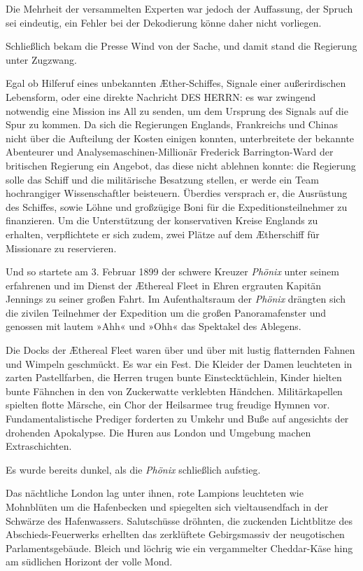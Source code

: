 Die Mehrheit der versammelten Experten war jedoch der Auffassung,
der Spruch sei eindeutig, ein Fehler bei der Dekodierung könne
daher nicht vorliegen.

Schließlich bekam die Presse Wind von der Sache, und damit stand
die Regierung unter Zugzwang.

\bigpar

Egal ob Hilferuf eines unbekannten Æther-Schiffes, Signale einer
außerirdischen Lebensform, oder eine direkte Nachricht DES HERRN:
es war zwingend notwendig eine Mission ins All zu senden, um dem
Ursprung des Signals auf die Spur zu kommen. Da sich die
Regierungen Englands, Frankreichs und Chinas nicht über die
Aufteilung der Kosten einigen konnten, unterbreitete der bekannte
Abenteurer und Analysemaschinen-Millionär Frederick Barrington-Ward
der britischen Regierung ein Angebot, das diese nicht ablehnen
konnte: die Regierung solle das Schiff und die militärische
Besatzung stellen, er werde ein Team hochrangiger Wissenschaftler
beisteuern. Überdies versprach er, die Ausrüstung des Schiffes,
sowie Löhne und großzügige Boni für die Expeditionsteilnehmer zu
finanzieren. Um die Unterstützung der konservativen Kreise Englands
zu erhalten, verpflichtete er sich zudem, zwei Plätze auf dem
Ætherschiff für Missionare zu reservieren.

\bigpar

Und so startete am 3. Februar 1899 der schwere Kreuzer \textit{Phönix} unter
seinem erfahrenen und im Dienst der Æthereal Fleet in Ehren
ergrauten Kapitän Jennings zu seiner großen Fahrt. Im
Aufenthaltsraum der \textit{Phönix} drängten sich die zivilen Teilnehmer der
Expedition um die großen Panoramafenster und genossen mit lautem
»Ahh« und »Ohh« das Spektakel des Ablegens.

Die Docks der Æthereal Fleet waren über und über mit lustig
flatternden Fahnen und Wimpeln geschmückt. Es war ein Fest. Die
Kleider der Damen leuchteten in zarten Pastellfarben, die Herren
trugen bunte Einstecktüchlein, Kinder hielten bunte Fähnchen in den
von Zuckerwatte verklebten Händchen. Militärkapellen spielten
flotte Märsche, ein Chor der Heilsarmee trug freudige Hymnen vor.
Fundamentalistische Prediger forderten zu Umkehr und Buße auf
angesichts der drohenden Apokalypse. Die Huren aus London und
Umgebung machen Extraschichten.

Es wurde bereits dunkel, als die \textit{Phönix} schließlich aufstieg.

Das nächtliche London lag unter ihnen, rote Lampions leuchteten wie
Mohnblüten um die Hafenbecken und spiegelten sich vieltausendfach
in der Schwärze des Hafenwassers. Salutschüsse dröhnten, die
zuckenden Lichtblitze des Abschieds-Feuerwerks erhellten das
zerklüftete Gebirgsmassiv der neugotischen Parlamentsgebäude.
Bleich und löchrig wie ein vergammelter Cheddar-Käse hing am
südlichen Horizont der volle Mond.


